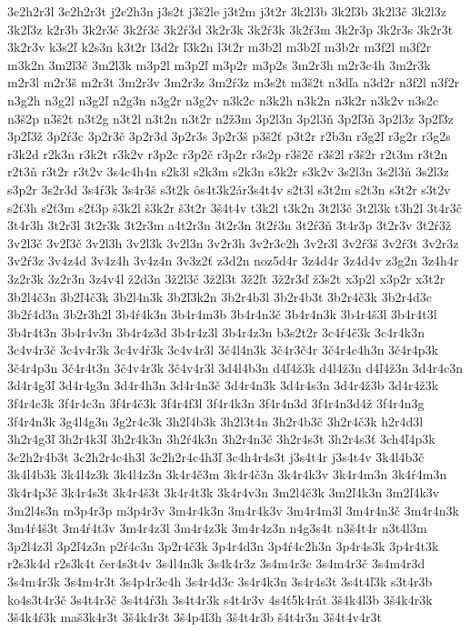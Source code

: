 {3c2h2r3l
3c2h2r3t
j2c2h3n
j3s2t
j3š2le
j3t2m
j3t2r
3k2l3b
3k2ľ3b
3k2l3č
3k2l3z
3k2ľ3z
k2r3b
3k2r3č
3k2ŕ3č
3k2ŕ3d
3k2r3k
3k2ŕ3k
3k2ŕ3m
3k2r3p
3k2r3s
3k2r3t
3k2r3v
k3s2ľ
k2s3n
k3t2r
l3d2r
ľ3k2n
l3t2r
m3b2l
m3b2ľ
m3b2r
m3f2l
m3f2r
m3k2n
3m2l3č
3m2l3k
m3p2l
m3p2ľ
m3p2r
m3p2s
3m2r3h
m2r3c4h
3m2r3k
m2r3l
m2r3š
m2r3t
3m2r3v
3m2r3z
3m2ŕ3z
m3s2t
m3š2t
n3dľa
n3d2r
n3f2l
n3f2r
n3g2h
n3g2l
n3g2ľ
n2g3n
n3g2r
n3g2v
n3k2c
n3k2h
n3k2n
n3k2r
n3k2v
n3s2c
n3š2p
n3š2t
n3t2g
n3t2l
n3t2n
n3t2r
n2ž3m
3p2l3n
3p2l3ň
3p2ľ3ň
3p2l3z
3p2ľ3z
3p2ľ3ž
3p2ŕ3c
3p2r3č
3p2r3d
3p2r3s
3p2r3š
p3š2ť
p3t2r
r2b3n
r3g2ľ
r3g2r
r3g2s
r3k2d
r2k3n
r3k2t
r3k2v
r3p2c
r3p2č
r3p2r
r3s2p
r3š2č
r3š2l
r3š2r
r2t3m
r3t2n
r2t3ň
r3t2r
r3t2v
3s4c4h4n
s2k3l
s2k3m
s2k3n
s3k2r
s3k2v
3s2l3n
3s2l3ň
3s2l3z
s3p2r
3s2r3d
3s4ŕ3k
3s4r3š
s3t2k
ôs4t3k2ár3s4t4v
s2t3l
s3t2m
s2t3n
s3t2r
s3t2v
s2ť3h
s2ť3m
s2ť3p
š3k2l
š3k2r
š3t2r
3š4t4v
t3k2l
t3k2n
3t2l3č
3t2l3k
t3h2l
3t4r3č
3t4r3h
3t2r3l
3t2r3k
3t2r3m
a4t2r3n
3t2r3n
3t2ŕ3n
3t2ŕ3ň
3t4r3p
3t2r3v
3t2ŕ3ž
3v2l3č
3v2ľ3č
3v2l3h
3v2l3k
3v2l3n
3v2r3h
3v2r3c2h
3v2r3l
3v2ŕ3š
3v2ŕ3t
3v2r3z
3v2ŕ3z
3v4z4d
3v4z4h
3v4z4n
3v3z2ť
z3d2n
noz5d4r
3z4d4r
3z4d4v
z3g2n
3z4h4r
3z2r3k
3z2r3n
3z4v4l
ž2d3n
3ž2l3č
3ž2l3t
3ž2ľt
3ž2r3ď
ž3s2t
x3p2l
x3p2r
x3t2r
3b2l4č3n
3b2ľ4č3k
3b2l4n3k
3b2ľ3k2n
3b2r4b3l
3b2r4b3t
3b2r4č3k
3b2r4d3c
3b2ŕ4d3n
3b2r3h2l
3b4ŕ4k3n
3b4r4m3b
3b4r4n3č
3b4r4n3k
3b4r4š3l
3b4r4t3l
3b4r4t3n
3b4r4v3n
3b4r4z3d
3b4r4z3l
3b4r4z3n
b3s2t2r
3c4ŕ4č3k
3c4r4k3n
3c4v4r3č
3c4v4r3k
3c4v4ŕ3k
3c4v4r3l
3č4l4n3k
3č4r3č4r
3č4r4c4h3n
3č4r4p3k
3č4r4p3n
3č4r4t3n
3č4v4r3k
3č4v4r3l
3d4l4b3n
d4ľ4ž3k
d4l4ž3n
d4ľ4ž3n
3d4r4c3n
3d4r4g3ľ
3d4r4g3n
3d4r4h3n
3d4r4n3č
3d4r4n3k
3d4r4s3n
3d4r4ž3b
3d4r4ž3k
3f4r4c3k
3f4r4c3n
3f4r4č3k
3f4r4f3l
3f4r4k3n
3f4r4n3d
3f4r4n3d4ž
3f4r4n3g
3f4r4n3k
3g4l4g3n
3g2r4c3k
3h2ľ4b3k
3h2l3t4n
3h2r4b3č
3h2r4č3k
h2r4d3l
3h2r4g3ľ
3h2r4k3ľ
3h2r4k3n
3h2ŕ4k3n
3h2r4n3č
3h2r4s3t
3h2r4s3ť
3ch4ľ4p3k
3c2h2r4b3t
3c2h2r4c4h3l
3c2h2r4c4h3ľ
3c4h4r4s3t
j3s4t4r
j3s4t4v
3k4l4b3č
3k4l4b3k
3k4l4z3k
3k4l4z3n
3k4r4č3m
3k4r4č3n
3k4r4k3v
3k4r4m3n
3k4ŕ4m3n
3k4r4p3č
3k4r4s3t
3k4r4š3t
3k4r4t3k
3k4r4v3n
3m2l4č3k
3m2ľ4k3n
3m2ľ4k3v
3m2l4s3n
m3p4r3p
m3p4r3v
3m4r4k3n
3m4r4k3v
3m4r4m3l
3m4r4n3č
3m4r4n3k
3m4ŕ4š3t
3m4ŕ4t3v
3m4r4z3l
3m4r4z3k
3m4r4z3n
n4g3s4t
n3š4t4r
n3t4l3m
3p2l4z3l
3p2ľ4z3n
p2ŕ4c3n
3p2r4č3k
3p4r4d3n
3p4ŕ4c2h3n
3p4r4s3k
3p4r4t3k
r2s3k4d
r2s3k4t
čer4s3t4v
3s4l4n3k
3s4k4r3z
3s4m4r3c
3s4m4r3č
3s4m4r3d
3s4m4r3k
3s4m4r3t
3s4p4r3c4h
3s4r4d3c
3s4r4k3n
3s4r4s3t
3s4t4ľ3k
s3t4r3b
ko4s3t4r3č
3s4t4r3č
3s4t4ŕ3h
3s4t4r3k
s4t4r3v
4s4ť5k4rát
3š4k4l3b
3š4k4r3k
3š4k4ŕ3k
maš3k4r3t
3š4k4r3t
3š4p4l3h
3š4t4r3b
š4t4r3n
3š4t4v4r3t
}
